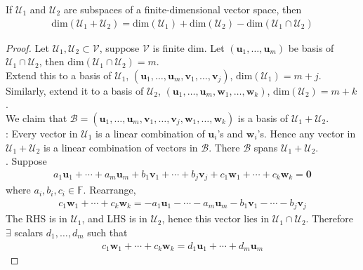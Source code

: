 \begin{theorem} If $\mathcal{U}_1$ and $\mathcal{U}_2$ are subspaces of a finite-dimensional vector space, then
\begin{align}
\text{dim}(\mathcal{U}_1 + \mathcal{U}_2) = \text{dim}(\mathcal{U}_1) + \text{dim}(\mathcal{U}_2) - \text{dim}(\mathcal{U}_1 \cap \mathcal{U}_2) \nonumber
\end{align}
\begin{proof} Let $\mathcal{U}_1, \mathcal{U}_2 \subset \mathcal{V}$, suppose $\mathcal{V}$ is finite dim. Let $(\mathbf{u}_1, \ldots, \mathbf{u}_m)$ be basis of $\mathcal{U}_1 \cap \mathcal{U}_2$, then $\text{dim}(\mathcal{U}_1 \cap \mathcal{U}_2) = m$.\\
Extend this to a basis of $\mathcal{U}_1$, $(\mathbf{u}_1, \ldots, \mathbf{u}_m, \mathbf{v}_1, \ldots, \mathbf{v}_j)$, $\text{dim}(\mathcal{U}_1) = m + j$.\\
Similarly, extend it to a basis of $\mathcal{U}_2$, $(\mathbf{u}_1, \ldots, \mathbf{u}_m, \mathbf{w}_1, \ldots, \mathbf{w}_k)$, $\text{dim}(\mathcal{U}_2) = m + k$.\\
We claim that $\mathcal{B} = (\mathbf{u}_1, \ldots, \mathbf{u}_m, \mathbf{v}_1, \ldots, \mathbf{v}_j, \mathbf{w}_1, \ldots, \mathbf{w}_k)$ is a basis of $\mathcal{U}_1 + \mathcal{U}_2$.\\
: Every vector in $\mathcal{U}_1$ is a linear combination of $\mathbf{u}_i$'s and $\mathbf{w}_i$'s. Hence any vector in $\mathcal{U}_1 + \mathcal{U}_2$ is a linear combination of vectors in $\mathcal{B}$. There $\mathcal{B}$ spans $\mathcal{U}_1 + \mathcal{U}_2$.\\
. Suppose
\begin{align}
a_1 \mathbf{u}_1 + \cdots + a_m \mathbf{u}_m + b_1 \mathbf{v}_1 + \cdots + b_j \mathbf{v}_j + c_1 \mathbf{w}_1 + \cdots + c_k \mathbf{w}_k = \mathbf{0} \nonumber
\end{align}
where $a_i, b_i, c_i \in \mathbb{F}$. Rearrange,
\begin{align}
c_1 \mathbf{w}_1 + \cdots + c_k \mathbf{w}_k = - a_1 \mathbf{u}_1 - \cdots - a_m \mathbf{u}_m - b_1 \mathbf{v}_1 - \cdots - b_j \mathbf{v}_j \nonumber
\end{align}
The RHS is in $\mathcal{U}_1$, and LHS is in $\mathcal{U}_2$, hence this vector lies in $\mathcal{U}_1 \cap \mathcal{U}_2$. Therefore $\exists$ scalars $d_1, \ldots, d_m$ such that
\begin{align}
c_1 \mathbf{w}_1 + \cdots + c_k \mathbf{w}_k = d_1 \mathbf{u}_1 + \cdots + d_m \mathbf{u}_m \nonumber

\end{align}
\end{proof}
\end{theorem}
